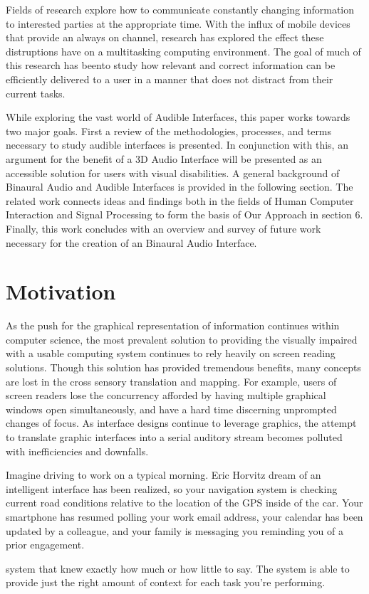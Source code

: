 Fields of research explore how to communicate constantly changing information
to interested parties at the appropriate time.  With the influx of mobile
devices that provide an always on channel, research has explored the effect
these distruptions have on a multitasking computing environment.  The goal of
much of this research has beento study how relevant and correct information can
be efficiently delivered to a user in a manner that does not distract from
their current tasks\cite{McCrickard2003509}.

While exploring the vast world of Audible Interfaces, this paper works towards
two major goals. First a review of the methodologies, processes, and terms
necessary to study audible interfaces is presented. In conjunction with this,
an argument for the benefit of a 3D Audio Interface will be presented as an
accessible solution for users with visual disabilities. A general background
of Binaural Audio and Audible Interfaces is provided in the following section.
The related work connects ideas and findings both in the fields of Human
Computer Interaction and Signal Processing to form the basis of Our Approach
in section 6. Finally, this work concludes with an overview and survey of
future work necessary for the creation of an Binaural Audio Interface.



\section{                  Motivation                                         }

As the push for the graphical representation of information continues within
computer science, the most prevalent solution to providing the visually impaired
with a usable computing system continues to rely heavily on screen reading
solutions. Though this solution has provided tremendous benefits, many concepts
are lost in the cross sensory translation and mapping.  For example, users of
screen readers lose the concurrency afforded by having multiple graphical
windows open simultaneously, and have a hard time discerning unprompted changes
of focus.  As interface designs continue to leverage graphics, the attempt to
translate graphic interfaces into a serial auditory stream becomes polluted with
inefficiencies and downfalls.

Imagine driving to work on a typical morning. Eric Horvitz dream of an
intelligent interface has been realized, so your navigation system is checking
current road conditions relative to the location of the GPS inside of the car.
Your smartphone has resumed polling your work email address, your calendar has
been updated by a colleague, and your family is messaging you reminding you of a
prior engagement.


system that knew exactly how much or how little to say.  The system is able to
provide just the right amount of context for each task you're performing.
